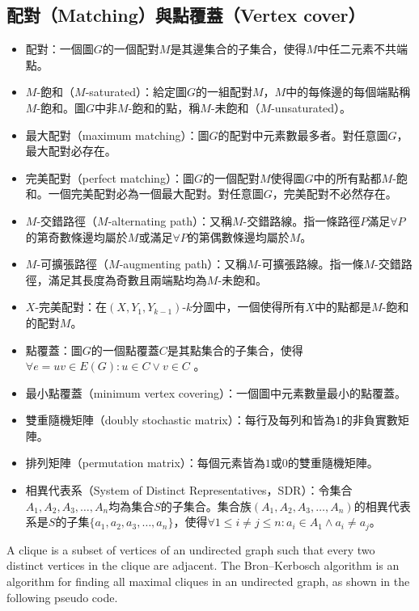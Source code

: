\documentclass[a4paper,12pt]{report}
\begin{document}
\subsection{配對（Matching）與點覆蓋（Vertex cover）}
\begin{itemize}
\item 配對：一個圖$G$的一個配對$M$是其邊集合的子集合，使得$M$中任二元素不共端點。
\item $M$-飽和（$M$-saturated）：給定圖$G$的一組配對$M$，$M$中的每條邊的每個端點稱$M$-飽和。圖$G$中非$M$-飽和的點，稱$M$-未飽和（$M$-unsaturated）。
\item 最大配對（maximum matching）：圖$G$的配對中元素數最多者。對任意圖$G$，最大配對必存在。
\item 完美配對（perfect matching）：圖$G$的一個配對$M$使得圖$G$中的所有點都$M$-飽和。一個完美配對必為一個最大配對。對任意圖$G$，完美配對不必然存在。
\item $M$-交錯路徑（$M$-alternating path）：又稱$M$-交錯路線。指一條路徑$P$滿足$\forall P$的第奇數條邊均屬於$M$或滿足$\forall P$的第偶數條邊均屬於$M$。
\item $M$-可擴張路徑（$M$-augmenting path）：又稱$M$-可擴張路線。指一條$M$-交錯路徑，滿足其長度為奇數且兩端點均為$M$-未飽和。
\item $X$-完美配對：在$(X, Y_1, Y_{k-1})$-$k$分圖中，一個使得所有$X$中的點都是$M$-飽和的配對$M$。
\item 點覆蓋：圖$G$的一個點覆蓋$C$是其點集合的子集合，使得$\forall e=uv \in E(G): u\in C \vee v\in C$ 。
\item 最小點覆蓋（minimum vertex covering）：一個圖中元素數量最小的點覆蓋。
\item 雙重隨機矩陣（doubly stochastic matrix）：每行及每列和皆為$1$的非負實數矩陣。
\item 排列矩陣（permutation matrix）：每個元素皆為$1$或$0$的雙重隨機矩陣。
\item 相異代表系（System of Distinct Representatives，SDR）：令集合$A_1, A_2, A_3, \ldots, A_n$均為集合$S$的子集合。集合族$(A_1, A_2, A_3, \ldots, A_n)$的相異代表系是$S$的子集$\{a_1, a_2, a_3, \ldots, a_n\}$，使得$\forall 1\leq i \neq j \leq n: a_i \in A_1 \wedge a_i \neq a_j$。
\end{itemize}
A clique is a subset of vertices of an undirected graph such that every two distinct vertices in the clique are adjacent.
The Bron–Kerbosch algorithm is an algorithm for finding all maximal cliques in an undirected graph, as shown in the following pseudo code.
\end{document}
